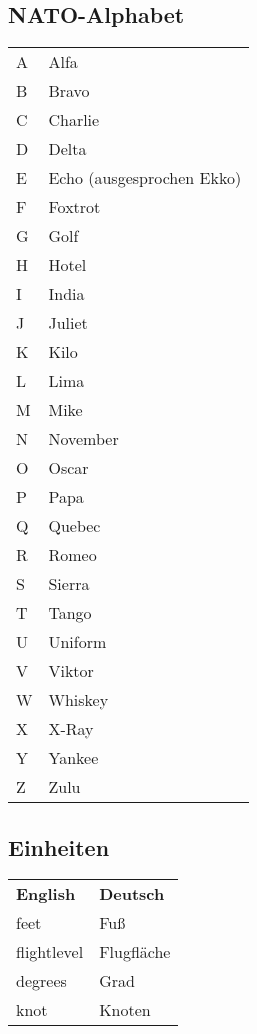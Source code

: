 \subsection{NATO-Alphabet}
\begin{table}[H]
	\begin{tabularx}{\textwidth}{XX}
		A & Alfa                      \\
		B & Bravo                     \\
		C & Charlie                   \\
		D & Delta                     \\
		E & Echo (ausgesprochen Ekko) \\
		F & Foxtrot                   \\
		G & Golf                      \\
		H & Hotel                     \\
		I & India                     \\
		J & Juliet                    \\
		K & Kilo                      \\
		L & Lima                      \\
		M & Mike                      \\
		N & November                  \\
		O & Oscar                     \\
		P & Papa                      \\
		Q & Quebec                    \\
		R & Romeo                     \\
		S & Sierra                    \\
		T & Tango                     \\
		U & Uniform                   \\
		V & Viktor                    \\
		W & Whiskey                   \\
		X & X-Ray                     \\
		Y & Yankee                    \\
		Z & Zulu                     
	\end{tabularx}
\end{table}

\subsection{Einheiten}
\begin{table}[H]
	\begin{tabularx}{\textwidth}{XX}
		\textbf{English} 	& \textbf{Deutsch}      \\
		feet        		& Fuß        \\
		flightlevel 		& Flugfläche \\
		degrees     		& Grad       \\
		knot        		& Knoten
	\end{tabularx}
\end{table}
